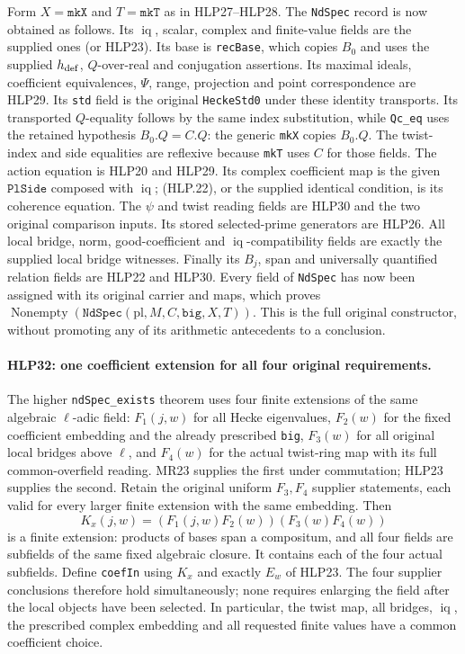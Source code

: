 Form \(X=\texttt{mkX}\) and \(T=\texttt{mkT}\) as in
HLP27--HLP28. The \texttt{NdSpec} record is now obtained as
follows. Its \(\operatorname{iq}\), scalar, complex and finite-value
fields are the supplied ones (or HLP23). Its base is
\texttt{recBase}, which copies \(B_0\) and uses the supplied
\(h_{\rm def}\), \(Q\)-over-real and conjugation assertions.
Its maximal ideals, coefficient equivalences, \(\Psi\), range,
projection and point correspondence are HLP29. Its \texttt{std}
field is the original \texttt{HeckeStd0} under these identity
transports. Its transported \(Q\)-equality follows by the same index
substitution, while \texttt{Qc\_eq} uses the retained hypothesis
\(B_0.Q=C.Q\): the generic \texttt{mkX} copies \(B_0.Q\).
The twist-index and side equalities are reflexive because
\texttt{mkT} uses \(C\) for those fields.
The action equation is HLP20 and HLP29. Its complex coefficient
map is the given \(\texttt{PlSide}\) composed with
\(\operatorname{iq}\); (HLP.22), or the supplied identical
condition, is its coherence equation. The \(\psi\) and twist
reading fields are HLP30 and the two original comparison inputs.
Its stored selected-prime generators are HLP26. All local bridge,
norm, good-coefficient and \(\operatorname{iq}\)-compatibility
fields are exactly the supplied local bridge witnesses. Finally
its \(B_j\), span and universally quantified relation fields are
HLP22 and HLP30. Every field of \texttt{NdSpec} has now been
assigned with its original carrier and maps, which proves
\(\operatorname{Nonempty}(\texttt{NdSpec}(\mathrm{pl},M,C,
\texttt{big},X,T))\). This is the full original constructor,
without promoting any of its arithmetic antecedents to a
conclusion.

\paragraph{HLP32: one coefficient extension for all four original requirements.}
\label{claim:HLP32}
The higher \texttt{ndSpec\_exists} theorem uses four finite
extensions of the same algebraic \(\ell\)-adic field: \(F_1(j,w)\)
for all Hecke eigenvalues, \(F_2(w)\) for the fixed coefficient
embedding and the already prescribed \texttt{big}, \(F_3(w)\)
for all original local bridges above \(\ell\), and \(F_4(w)\)
for the actual twist-ring map with its full common-overfield
reading. MR23 supplies the first under commutation; HLP23 supplies
the second. Retain the original uniform \(F_3,F_4\) supplier
statements, each valid for every larger finite extension with
the same embedding. Then
\[
 K_x(j,w)=(F_1(j,w)F_2(w))(F_3(w)F_4(w))             \tag{HLP.24}
\]
is a finite extension: products of bases span a compositum, and
all four fields are subfields of the same fixed algebraic closure.
It contains each of the four actual subfields. Define
\texttt{coefIn} using \(K_x\) and exactly \(E_w\) of HLP23.
The four supplier conclusions therefore hold simultaneously;
none requires enlarging the field after the local objects have
been selected. In particular, the twist map, all bridges,
\(\operatorname{iq}\), the prescribed complex embedding and
all requested finite values have a common coefficient choice.

